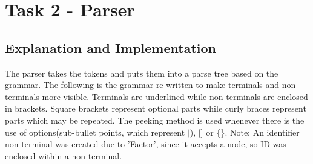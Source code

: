 \section{Task 2 - Parser}
\subsection{Explanation and Implementation}

The parser takes the tokens and puts them into a parse tree based on the grammar. The following is the grammar re-written to make terminals and non terminals more visible. Terminals are underlined while non-terminals are enclosed in brackets. Square brackets represent optional parts while curly braces represent parts which may be repeated. The peeking method is used whenever there is the use of options(sub-bullet points, which represent $|$), [] or \{\}. Note: An identifier non-terminal was created due to 'Factor', since it accepts a node, so ID was enclosed within a non-terminal.

